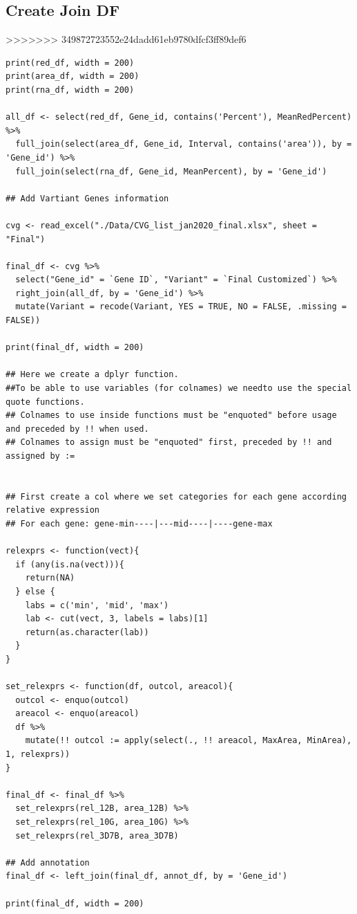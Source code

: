 \documentclass[11pt]{article}
\begin{document}
\subsection{Create Join DF}
\label{sec:org5d1341b}
>>>>>>> 349872723552e24dadd61eb9780dfcf3ff89def6
\begin{verbatim}
print(red_df, width = 200)
print(area_df, width = 200)
print(rna_df, width = 200)

all_df <- select(red_df, Gene_id, contains('Percent'), MeanRedPercent) %>%
  full_join(select(area_df, Gene_id, Interval, contains('area')), by = 'Gene_id') %>%
  full_join(select(rna_df, Gene_id, MeanPercent), by = 'Gene_id')

## Add Vartiant Genes information

cvg <- read_excel("./Data/CVG_list_jan2020_final.xlsx", sheet = "Final")

final_df <- cvg %>%
  select("Gene_id" = `Gene ID`, "Variant" = `Final Customized`) %>%
  right_join(all_df, by = 'Gene_id') %>%
  mutate(Variant = recode(Variant, YES = TRUE, NO = FALSE, .missing = FALSE))

print(final_df, width = 200)

## Here we create a dplyr function.
##To be able to use variables (for colnames) we needto use the special quote functions.
## Colnames to use inside functions must be "enquoted" before usage and preceded by !! when used.
## Colnames to assign must be "enquoted" first, preceded by !! and assigned by :=


## First create a col where we set categories for each gene according relative expression
## For each gene: gene-min----|---mid----|----gene-max

relexprs <- function(vect){
  if (any(is.na(vect))){
    return(NA)
  } else {
    labs = c('min', 'mid', 'max')
    lab <- cut(vect, 3, labels = labs)[1]
    return(as.character(lab))
  }
}

set_relexprs <- function(df, outcol, areacol){
  outcol <- enquo(outcol)
  areacol <- enquo(areacol)
  df %>%
    mutate(!! outcol := apply(select(., !! areacol, MaxArea, MinArea), 1, relexprs))
}

final_df <- final_df %>%
  set_relexprs(rel_12B, area_12B) %>%
  set_relexprs(rel_10G, area_10G) %>%
  set_relexprs(rel_3D7B, area_3D7B)

## Add annotation
final_df <- left_join(final_df, annot_df, by = 'Gene_id')

print(final_df, width = 200)

\end{verbatim}
\end{document}
